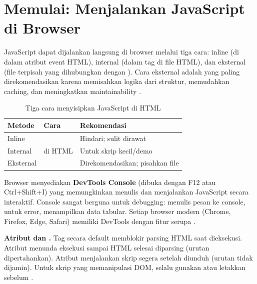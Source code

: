 ﻿\section{Memulai: Menjalankan JavaScript di Browser}

JavaScript dapat dijalankan langsung di browser melalui tiga cara: inline (di dalam atribut event HTML), internal (dalam tag  di file HTML), dan eksternal (file  terpisah yang dihubungkan dengan ). Cara eksternal adalah yang paling direkomendasikan karena memisahkan logika dari struktur, memudahkan caching, dan meningkatkan maintainability \cite{mdnJsGuide}.

\begin{table}[H]
\centering
\begin{tabular}{|P{2.5cm}|P{4.5cm}|P{5cm}|}
\hline
\textbf{Metode} & \textbf{Cara} & \textbf{Rekomendasi} \\
\hline
Inline &  & Hindari; sulit dirawat \\
\hline
Internal &  di HTML & Untuk skrip kecil/demo \\
\hline
Eksternal &  & Direkomendasikan; pisahkan file \\
\hline
\end{tabular}
\caption{Tiga cara menyisipkan JavaScript di HTML}
\end{table}

Browser menyediakan \textbf{DevTools Console} (dibuka dengan F12 atau Ctrl+Shift+I) yang memungkinkan menulis dan menjalankan JavaScript secara interaktif. Console sangat berguna untuk debugging:  menulis pesan ke console,  untuk error,  menampilkan data tabular. Setiap browser modern (Chrome, Firefox, Edge, Safari) memiliki DevTools dengan fitur serupa \cite{jsInfo}.

\begin{catatan}
\textbf{Atribut  dan .} Tag  secara default memblokir parsing HTML saat dieksekusi. Atribut  menunda eksekusi sampai HTML selesai diparsing (urutan dipertahankan). Atribut  menjalankan skrip segera setelah diunduh (urutan tidak dijamin). Untuk skrip yang memanipulasi DOM, selalu gunakan  atau letakkan  sebelum  \cite{mdnJsGuide}.
\end{catatan}

